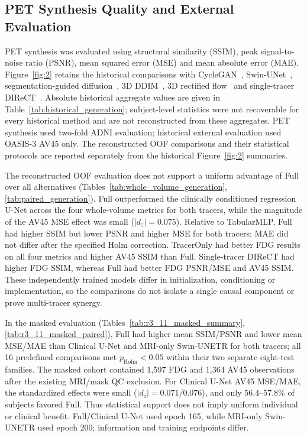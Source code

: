 \documentclass{article}
\begin{document}
\subsection{PET Synthesis Quality and External Evaluation}
PET synthesis was evaluated using structural similarity (SSIM), peak signal-to-noise ratio (PSNR), mean squared error (MSE) and mean absolute error (MAE). Figure~\ref{fig:2} retains the historical comparisons with CycleGAN~\cite{zhu2017unpaired}, Swin-UNet~\cite{Cao2021swin}, segmentation-guided diffusion~\cite{konz2024anatomically}, 3D DDIM~\cite{song2021ddim,pinaya2023generative}, 3D rectified flow~\cite{Xing2022} and single-tracer DIReCT~\cite{liu2025direct}. Absolute historical aggregate values are given in Table~\ref{tab:historical_generation}; subject-level statistics were not recoverable for every historical method and are not reconstructed from these aggregates.
PET synthesis used two-fold ADNI evaluation; historical external evaluation used OASIS-3 AV45 only. The reconstructed OOF comparisons and their statistical protocols are reported separately from the historical Figure~\ref{fig:2} summaries.

The reconstructed OOF evaluation does not support a uniform advantage of Full over all alternatives (Tables~\ref{tab:whole_volume_generation},\ref{tab:paired_generation}). Full outperformed the clinically conditioned regression U-Net across the four whole-volume metrics for both tracers, while the magnitude of the AV45 MSE effect was small ($|d_z|=0.075$). Relative to TabularMLP, Full had higher SSIM but lower PSNR and higher MSE for both tracers; MAE did not differ after the specified Holm correction. TracerOnly had better FDG results on all four metrics and higher AV45 SSIM than Full. Single-tracer DIReCT had higher FDG SSIM, whereas Full had better FDG PSNR/MSE and AV45 SSIM. These independently trained models differ in initialization, conditioning or implementation, so the comparisons do not isolate a single causal component or prove multi-tracer synergy.

In the masked evaluation (Tables~\ref{tab:r3_11_masked_summary},\ref{tab:r3_11_masked_paired}), Full had higher mean SSIM/PSNR and lower mean MSE/MAE than Clinical U-Net and MRI-only Swin-UNETR for both tracers; all 16 predefined comparisons met $p_{\mathrm{Holm}}<0.05$ within their two separate eight-test families. The masked cohort contained 1,597 FDG and 1,364 AV45 observations after the existing MRI/mask QC exclusion. For Clinical U-Net AV45 MSE/MAE, the standardized effects were small ($|d_z|=0.071/0.076$), and only 56.4--57.8\% of subjects favored Full. Thus statistical support does not imply uniform individual or clinical benefit. Full/Clinical U-Net used epoch 165, while MRI-only Swin-UNETR used epoch 200; information and training endpoints differ.
\end{document}
